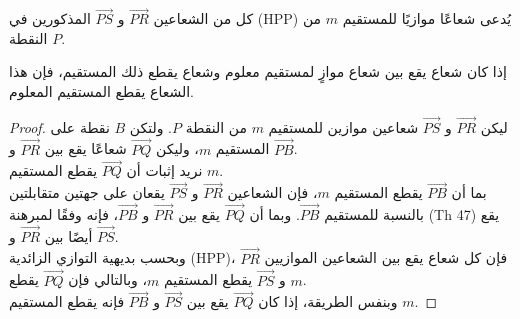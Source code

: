 \begin{definition}
\begin{enumerate}
\end{enumerate}
\end{definition}

\begin{definition}
	كل من الشعاعين $\overrightarrow{PR}$ و $\overrightarrow{PS}$ المذكورين في (HPP) يُدعى شعاعًا موازيًا للمستقيم $m$ من النقطة $P$.
\end{definition}

\begin{theorem}
	إذا كان شعاع يقع بين شعاع موازٍ لمستقيم معلوم وشعاع يقطع ذلك المستقيم، فإن هذا الشعاع يقطع المستقيم المعلوم.
\end{theorem}
\begin{proof}
	ليكن $\overrightarrow{PR}$ و $\overrightarrow{PS}$ شعاعين موازين للمستقيم $m$ من النقطة $P$. ولتكن $B$ نقطة على المستقيم $m$، وليكن $\overrightarrow{PQ}$ شعاعًا يقع بين $\overrightarrow{PR}$ و $\overrightarrow{PB}$.\\
	نريد إثبات أن $\overrightarrow{PQ}$ يقطع المستقيم $m$.\\
	بما أن $\overrightarrow{PB}$ يقطع المستقيم $m$، فإن الشعاعين $\overrightarrow{PR}$ و $\overrightarrow{PS}$ يقعان على جهتين متقابلتين بالنسبة للمستقيم $\overrightarrow{PB}$. وبما أن $\overrightarrow{PQ}$ يقع بين $\overrightarrow{PR}$ و $\overrightarrow{PB}$، فإنه وفقًا لمبرهنة (Th 47) يقع أيضًا بين $\overrightarrow{PR}$ و $\overrightarrow{PS}$.\\
	وبحسب بديهية التوازي الزائدية (HPP)، فإن كل شعاع يقع بين الشعاعين الموازيين $\overrightarrow{PR}$ و $\overrightarrow{PS}$ يقطع المستقيم $m$، وبالتالي فإن $\overrightarrow{PQ}$ يقطع $m$.\\
	وبنفس الطريقة، إذا كان $\overrightarrow{PQ}$ يقع بين $\overrightarrow{PS}$ و $\overrightarrow{PB}$ فإنه يقطع المستقيم $m$.
\end{proof}


